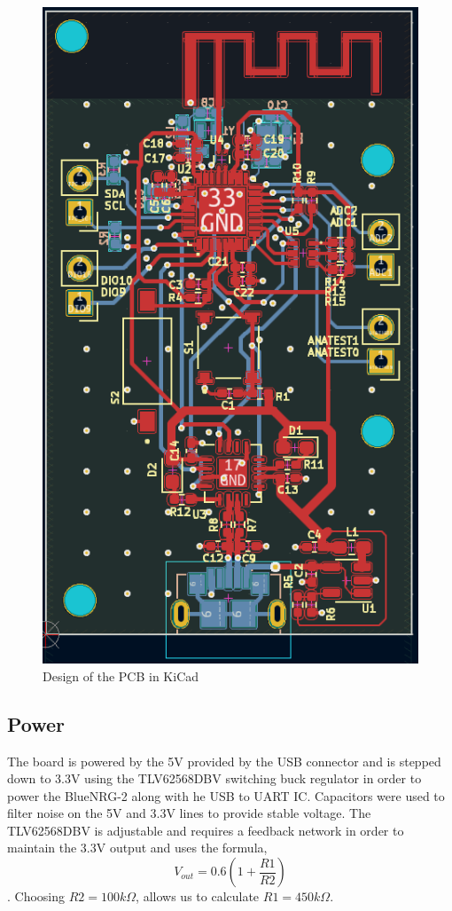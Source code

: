 \documentclass[12pt,journal,onecolumn,draftclsnofoot]{IEEEtran}
\begin{document}
\begin{figure}[H]
\centering
\includegraphics[]{Pics/pcb.png}
\caption{Design of the PCB in KiCad} 
\label{fig:pcb}
\end{figure}

\subsection{Power}
The board is powered by the 5V provided by the USB connector and is stepped down to 3.3V using the TLV62568DBV switching buck regulator in order to power the BlueNRG-2 along with he USB to UART IC. Capacitors were used to filter noise on the 5V and 3.3V lines to provide stable voltage. The TLV62568DBV is adjustable and requires a feedback network in order to maintain the 3.3V output and uses the formula, \[V_{out} = 0.6\left(1 + \frac{R1}{R2}\right)\]. Choosing $R2 = 100k\Omega$, allows us to calculate $R1 = 450k\Omega$. \par
\end{document}
